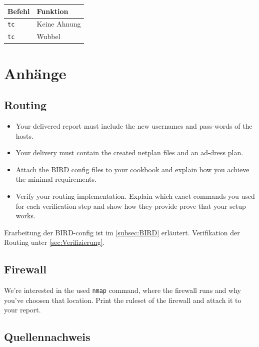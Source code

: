 \documentclass[11pt,titlepage]{article}
\newenvironment{shadedquotation}
 {\begin{shaded*}
  \quoting[leftmargin=0pt, vskip=0pt]
 }
 {\endquoting
 \end{shaded*}
}
\begin{document}
\par\medskip 

\begin{tabular}{ |p{4cm}|p{10cm}|}
  \hline
  \textbf{Befehl} & \textbf{Funktion} \\
  \hline
  \lstinline!tc! & Keine Ahnung \\
  \hline
  \lstinline!tc! & Wubbel \\
  \hline
\end{tabular}

\section{Anhänge}
\label{sec:Anhänge}

\subsection{Routing}
\label{subsec:Routing}
\begin{shadedquotation}
  \begin{itemize}
    \item Your delivered report must include the new usernames and pass-words of the hosts.
    \item Your delivery must contain the created netplan files and an ad-dress plan.
    \item Attach the BIRD config files to your cookbook and explain how you achieve the minimal requirements.
    \item Verify your routing implementation. Explain which exact commands you used for each verification step and show how they provide prove that your setup works.
  \end{itemize}
\end{shadedquotation}
Erarbeitung der BIRD-config ist im \ref{subsec:BIRD} erläutert.
Verifikation der Routing unter \ref{sec:Verifizierung}.

\subsection{Firewall}
\label{subsec:Firewall}

\begin{shadedquotation}
  We’re interested in the used \lstinline!nmap! command, where the firewall runs and why you’ve choosen that location. Print the ruleset of the firewall and attach it to your report.
\end{shadedquotation}

\subsection{Quellennachweis}
\label{subsec:Quellennachweis}
\end{document}
